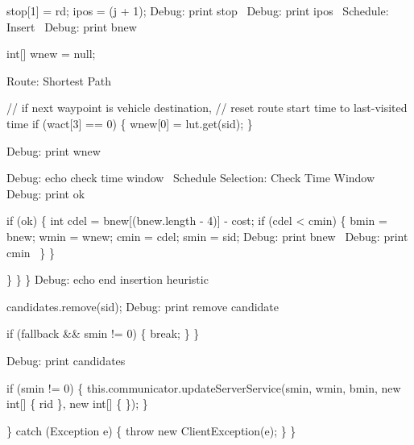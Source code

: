             stop[1] = rd;
            ipos = (j + 1);
            \LA{}Debug: print stop~{\nwtagstyle{}}\RA{}
            \LA{}Debug: print ipos~{\nwtagstyle{}}\RA{}
            \LA{}Schedule: Insert~{\nwtagstyle{}}\RA{}
            \LA{}Debug: print bnew~{\nwtagstyle{}}\RA{}

            int[] wnew = null;

            \LA{}Route: Shortest Path~{\nwtagstyle{}}\RA{}

            // if next waypoint is vehicle destination,
            // reset route start time to last-visited time
            if (wact[3] == 0) \{
              wnew[0] = lut.get(sid);
            \}

            \LA{}Debug: print wnew~{\nwtagstyle{}}\RA{}

            \LA{}Debug: echo check time window~{\nwtagstyle{}}\RA{}
            \LA{}Schedule Selection: Check Time Window~{\nwtagstyle{}}\RA{}
            \LA{}Debug: print ok~{\nwtagstyle{}}\RA{}

            if (ok) \{
              int cdel = bnew[(bnew.length - 4)] - cost;
              if (cdel < cmin) \{
                bmin = bnew;
                wmin = wnew;
                cmin = cdel;
                smin = sid;
                \LA{}Debug: print bnew~{\nwtagstyle{}}\RA{}
                \LA{}Debug: print cmin~{\nwtagstyle{}}\RA{}
              \}
            \}

          \}
        \}
      \}
      \LA{}Debug: echo end insertion heuristic~{\nwtagstyle{}}\RA{}

      candidates.remove(sid);
      \LA{}Debug: print remove candidate~{\nwtagstyle{}}\RA{}

      if (fallback && smin != 0) \{
        break;
      \}
    \}

    \LA{}Debug: print candidates~{\nwtagstyle{}}\RA{}

    if (smin != 0) \{
      this.communicator.updateServerService(smin, wmin, bmin,
          new int[] \{ rid \}, new int[] \{ \});
    \}

  \} catch (Exception e) \{
    throw new ClientException(e);
  \}
\}
\nwendcode{}\nwdocspar


